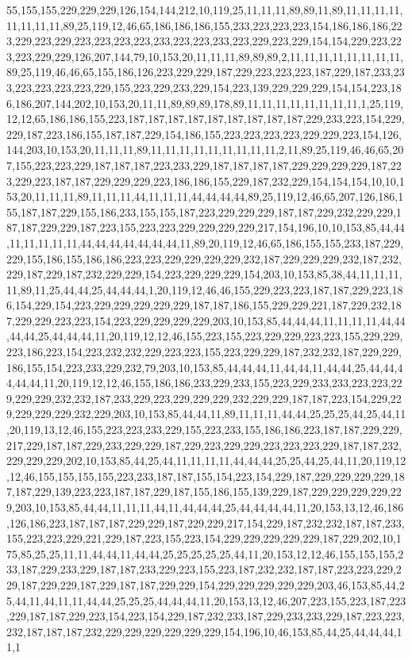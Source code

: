 55,155,155,229,229,229,126,154,144,212,10,119,25,11,11,11,89,89,11,89,11,11,11,11,11,11,11,11,89,25,119,12,46,65,186,186,186,155,233,223,223,223,154,186,186,186,223,229,223,229,223,223,223,223,233,223,223,233,223,229,223,229,154,154,229,223,223,223,229,229,126,207,144,79,10,153,20,11,11,11,89,89,89,2,11,11,11,11,11,11,11,11,89,25,119,46,46,65,155,186,126,223,229,229,187,229,223,223,223,187,229,187,233,233,223,223,223,223,229,155,223,229,233,229,154,223,139,229,229,229,154,154,223,186,186,207,144,202,10,153,20,11,11,89,89,89,178,89,11,11,11,11,11,11,11,11,1,25,119,12,12,65,186,186,155,223,187,187,187,187,187,187,187,187,187,229,233,223,154,229,229,187,223,186,155,187,187,229,154,186,155,223,223,223,223,229,229,223,154,126,144,203,10,153,20,11,11,11,89,11,11,11,11,11,11,11,11,11,2,11,89,25,119,46,46,65,207,155,223,223,229,187,187,187,223,233,229,187,187,187,187,229,229,229,229,187,223,229,223,187,187,229,229,229,223,186,186,155,229,187,232,229,154,154,154,10,10,153,20,11,11,11,89,11,11,11,44,11,11,11,44,44,44,44,89,25,119,12,46,65,207,126,186,155,187,187,229,155,186,233,155,155,187,223,229,229,229,187,187,229,232,229,229,187,187,229,229,187,223,155,223,223,229,229,229,229,217,154,196,10,10,153,85,44,44,11,11,11,11,11,44,44,44,44,44,44,44,11,89,20,119,12,46,65,186,155,155,233,187,229,229,155,186,155,186,186,223,223,229,229,229,229,232,187,229,229,229,232,187,232,229,187,229,187,232,229,229,154,223,229,229,229,154,203,10,153,85,38,44,11,11,11,11,89,11,25,44,44,25,44,44,44,1,20,119,12,46,46,155,229,223,223,187,187,229,223,186,154,229,154,223,229,229,229,229,229,187,187,186,155,229,229,221,187,229,232,187,229,229,223,223,154,223,229,229,229,229,203,10,153,85,44,44,44,11,11,11,11,44,44,44,44,25,44,44,44,11,20,119,12,12,46,155,223,155,223,229,229,223,223,155,229,229,223,186,223,154,223,232,232,229,223,223,155,223,229,229,187,232,232,187,229,229,186,155,154,223,233,229,232,79,203,10,153,85,44,44,44,11,44,44,11,44,44,25,44,44,44,44,44,11,20,119,12,12,46,155,186,186,233,229,233,155,223,229,233,233,223,223,229,229,229,232,232,187,233,229,223,229,229,229,232,229,229,187,187,223,154,229,229,229,229,229,232,229,203,10,153,85,44,44,11,89,11,11,11,44,44,25,25,25,44,25,44,11,20,119,13,12,46,155,223,223,233,229,155,223,233,155,186,186,223,187,187,229,229,217,229,187,187,229,233,229,229,187,229,223,229,229,223,223,223,229,187,187,232,229,229,229,202,10,153,85,44,25,44,11,11,11,11,44,44,44,25,25,44,25,44,11,20,119,12,12,46,155,155,155,155,223,233,187,187,155,154,223,154,229,187,229,229,229,229,187,187,229,139,223,223,187,187,229,187,155,186,155,139,229,187,229,229,229,229,229,203,10,153,85,44,44,11,11,11,44,11,44,44,44,25,44,44,44,44,11,20,153,13,12,46,186,126,186,223,187,187,187,229,229,187,229,229,217,154,229,187,232,232,187,187,233,155,223,223,229,221,229,187,223,155,223,154,229,229,229,229,229,187,229,202,10,175,85,25,25,11,11,44,44,11,44,44,25,25,25,25,25,44,11,20,153,12,12,46,155,155,155,233,187,229,233,229,187,187,233,229,223,155,223,187,232,232,187,187,223,223,229,229,187,229,229,187,229,187,187,229,229,154,229,229,229,229,229,203,46,153,85,44,25,44,11,44,11,11,44,44,25,25,25,44,44,44,11,20,153,13,12,46,207,223,155,223,187,223,229,187,187,229,223,154,223,154,229,187,232,233,187,229,233,233,229,187,223,223,232,187,187,187,232,229,229,229,229,229,229,154,196,10,46,153,85,44,25,44,44,44,11,1